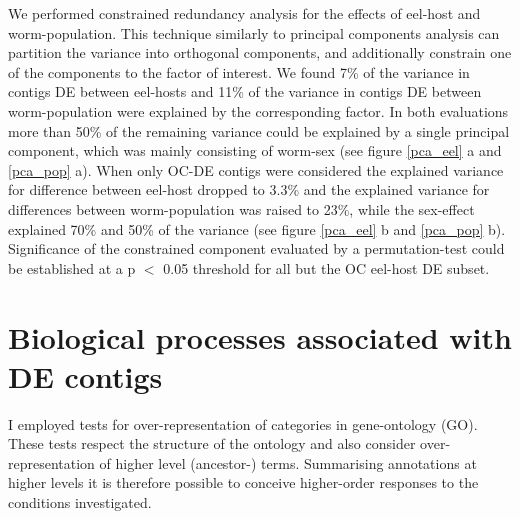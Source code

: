 We performed constrained redundancy analysis for the effects of
eel-host and worm-population. This technique similarly to principal
components analysis can partition the variance into orthogonal
components, and additionally constrain one of the components to the
factor of interest. We found 7\% of the variance in contigs DE between
eel-hosts and 11\% of the variance in contigs DE between
worm-population were explained by the corresponding factor. In both
evaluations more than 50\% of the remaining variance could be
explained by a single principal component, which was mainly consisting
of worm-sex (see figure \ref{pca_eel} a and \ref{pca_pop} a). When
only OC-DE contigs were considered the explained variance for
difference between eel-host dropped to 3.3\% and the explained
variance for differences between worm-population was raised to 23\%,
while the sex-effect explained 70\% and 50\% of the variance (see
figure \ref{pca_eel} b and \ref{pca_pop} b). Significance of the
constrained component evaluated by a permutation-test could be
established at a p $<$ 0.05 threshold for all but the OC eel-host DE
subset.



\afterpage{\clearpage}

\section{Biological processes associated with DE contigs}

I employed tests for over-representation of categories in
gene-ontology (GO). These tests respect the structure of the ontology
and also consider over-representation of higher level (ancestor-)
terms. Summarising annotations at higher levels it is therefore
possible to conceive higher-order responses to the conditions
investigated.

